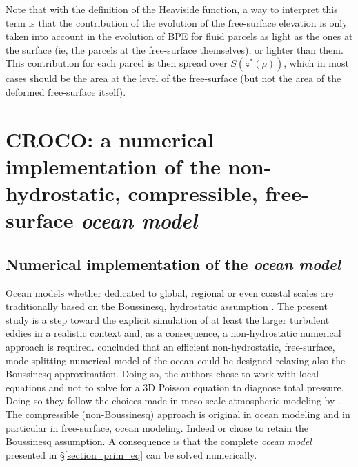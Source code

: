 Note that with the definition of the Heaviside function, a way to interpret this term is that the contribution of the evolution of the free-surface elevation is only taken into account in the evolution of BPE for fluid parcels as light as the ones at the surface (ie, the parcels at the free-surface themselves), or lighter than them. This contribution for each parcel is then spread over $S(z^*(\rho))$, which in most cases should be the area at the level of the free-surface (but not the area of the deformed free-surface itself).


 
 \section{CROCO: a numerical implementation of the non-hydrostatic, compressible, free-surface \textit{ocean model}}
 \label{section_croco}
 
\subsection{Numerical implementation of the \textit{ocean model}}
Ocean models whether dedicated to global, regional or even coastal scales are traditionally based on the Boussinesq, hydrostatic assumption \citep{griffies_elements_2012,shchepetkin_regional_2005}. The present study is a step toward the explicit simulation of at least the larger turbulent eddies in a realistic context and, as a consequence, a non-hydrostatic numerical approach is required. \cite{auclair_non-hydrostatic_2018} concluded that an efficient non-hydrostatic, free-surface, mode-splitting numerical model of the ocean could be designed relaxing also the Boussinesq approximation. Doing so, the authors chose to work with local equations and not to solve for a 3D Poisson equation to diagnose total pressure. Doing so they follow the choices made in meso-scale atmospheric modeling by \cite{skamarock_prototypes_2001}. The compressible (non-Boussinesq) approach is original in ocean modeling and in particular in free-surface, ocean modeling. Indeed \cite{marshall_finite-volume_1997} or \cite{auclair_non-hydrostatic_2011} chose to retain the Boussinesq assumption. A consequence is that the complete \textit{ocean model} presented in \S\ref{section_prim_eq} can be solved numerically.

